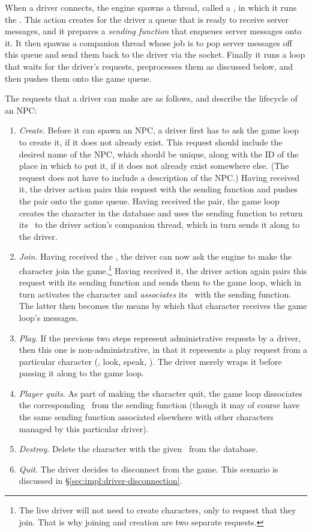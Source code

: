 When a driver connects, the engine spawns a thread, called a
, in which it runs the .
This action creates for the driver a queue that is ready to receive
server messages, and it prepares a {\em sending function} that enqueues server
messages onto it.
It then spawns a companion thread whose job is to pop server messages off this
queue and send them back to the driver via the socket.
Finally it runs a loop that waits for the driver's requests, preprocesses
them as discussed below, and then pushes them onto the game queue.

The requests that a driver can make are as follows, and describe the lifecycle
of an NPC:
\begin{enumerate}
    \item {\em Create}.
    Before it can spawn an NPC, a driver first has to ask the game loop to
    create it, if it does not already exist.
    This request should include the desired name of the NPC, which should be
    unique, along with the ID of the place in which to put it, if it does not
    already exist somewhere else.
    (The request does not have to include a description of the NPC\@.)
    Having received it, the driver action pairs this request with the
    sending function and pushes the pair onto the game queue.
    Having received the pair, the game loop creates the character in the
    database and uses the sending function to return its \cid\ to the driver
    action's companion thread, which in turn sends it along to the driver.
    \item {\em Join}.
    Having received the \cid, the driver can now ask the
    engine to make the character join the game.\footnote{The live driver will
    not need to create characters, only to request that they join.
    That is why joining and creation are two separate requests.}
    Having received it, the driver action again pairs this request with its
    sending function and sends them to the game loop, which in turn activates
    the character and {\em associates} its \cid\ with the sending function.
    The latter then becomes the means by which that character receives the game
    loop's messages.
    \item {\em Play}.
    If the previous two steps represent administrative requests by a driver,
    then this one is non-administrative, in that it represents a play request
    from a particular character (\eg, look, speak, \etc).
    The driver merely wraps it before passing it along to the game loop.
    \item {\em Player quits}.
    As part of making the character quit, the game loop dissociates the
    corresponding \cid\ from the sending function (though
    it may of course have the same sending function associated elsewhere with
    other characters managed by this particular driver).
    \item {\em Destroy}.
    Delete the character with the given \cid\ from the database.
    \item {\em Quit}.
    The driver decides to disconnect from the game.
    This scenario is discussed in \S\ref{sec:impl:driver-disconnection}.
\end{enumerate}
